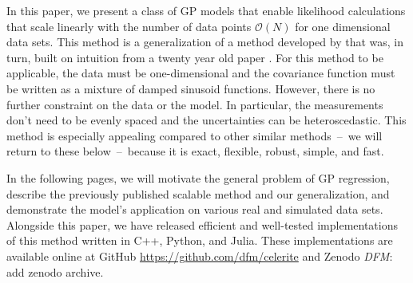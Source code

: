 \documentclass[manuscript, letterpaper]{aastex6}
\makeatletter
\let\origsection\section
\renewcommand\section{\@ifstar{\starsection}{\nostarsection}}
\newcommand\nostarsection[1]{\sectionprelude\origsection{#1}}
\newcommand\starsection[1]{\sectionprelude\origsection*{#1}}
\newcommand\sectionprelude{\vspace{1em}}
\newcommand{\project}[1]{\textsf{#1}}
\newcommand{\todo}[3]{{\color{#2}\emph{#1}: #3}}
\newcommand{\dfmtodo}[1]{\todo{DFM}{red}{#1}}
\makeatother
\begin{document}
In this paper, we present a class of GP models that enable likelihood
calculations that scale linearly with the number of data points
$\mathcal{O}(N)$ for one dimensional data sets.
This method is a generalization of a method developed by
\citet{Ambikasaran:2015} that was, in turn, built on intuition from a twenty
year old paper \citep{Rybicki:1995}.
For this method to be applicable, the data must be one-dimensional and the
covariance function must be written as a mixture of damped sinusoid functions.
However, there is no further constraint on the data or the model.
In particular, the measurements don't need to be evenly spaced and the
uncertainties can be heteroscedastic.
This method is especially appealing compared to other similar methods~--~we
will return to these below~--~because it is exact, flexible, robust, simple,
and fast.

In the following pages, we will motivate the general problem of GP regression,
describe the previously published scalable method \citep{Rybicki:1995,
Ambikasaran:2015} and our generalization, and demonstrate the model's
application on various real and simulated data sets.
Alongside this paper, we have released efficient and well-tested
implementations of this method written in \project{C++}, \project{Python}, and
\project{Julia}.
These implementations are available online at \project{GitHub}
\url{https://github.com/dfm/celerite} and \project{Zenodo} \dfmtodo{add zenodo
archive}.

%
%

\section{Gaussian processes}
\end{document}
